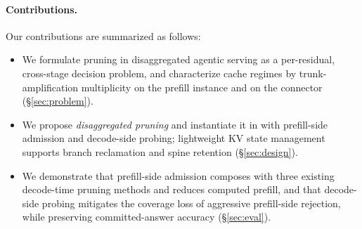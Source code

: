 \paragraph{Contributions.}
Our contributions are summarized as follows:
\begin{itemize}[leftmargin=*,itemsep=1pt,topsep=2pt]
\item We formulate pruning in disaggregated agentic serving as a per-residual, cross-stage decision problem, and characterize cache regimes by trunk-amplification multiplicity on the prefill instance and on the connector (\S\ref{sec:problem}).
\item We propose \emph{disaggregated pruning} and instantiate it in \sys{} with prefill-side admission and decode-side probing; lightweight KV state management supports branch reclamation and spine retention (\S\ref{sec:design}).
\item We demonstrate that prefill-side admission composes with three existing decode-time pruning methods and reduces computed prefill, and that decode-side probing mitigates the coverage loss of aggressive prefill-side rejection, while preserving committed-answer accuracy (\S\ref{sec:eval}).
\end{itemize}
